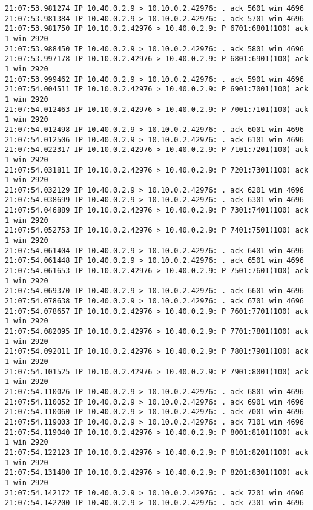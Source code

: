 \documentclass[a4paper,12pt]{article}
\begin{document}
\begin{Verbatim}
21:07:53.981274 IP 10.40.0.2.9 > 10.10.0.2.42976: . ack 5601 win 4696 
21:07:53.981384 IP 10.40.0.2.9 > 10.10.0.2.42976: . ack 5701 win 4696 
21:07:53.981750 IP 10.10.0.2.42976 > 10.40.0.2.9: P 6701:6801(100) ack 1 win 2920 
21:07:53.988450 IP 10.40.0.2.9 > 10.10.0.2.42976: . ack 5801 win 4696 
21:07:53.997178 IP 10.10.0.2.42976 > 10.40.0.2.9: P 6801:6901(100) ack 1 win 2920 
21:07:53.999462 IP 10.40.0.2.9 > 10.10.0.2.42976: . ack 5901 win 4696 
21:07:54.004511 IP 10.10.0.2.42976 > 10.40.0.2.9: P 6901:7001(100) ack 1 win 2920 
21:07:54.012463 IP 10.10.0.2.42976 > 10.40.0.2.9: P 7001:7101(100) ack 1 win 2920 
21:07:54.012498 IP 10.40.0.2.9 > 10.10.0.2.42976: . ack 6001 win 4696 
21:07:54.012506 IP 10.40.0.2.9 > 10.10.0.2.42976: . ack 6101 win 4696 
21:07:54.022317 IP 10.10.0.2.42976 > 10.40.0.2.9: P 7101:7201(100) ack 1 win 2920 
21:07:54.031811 IP 10.10.0.2.42976 > 10.40.0.2.9: P 7201:7301(100) ack 1 win 2920 
21:07:54.032129 IP 10.40.0.2.9 > 10.10.0.2.42976: . ack 6201 win 4696 
21:07:54.038699 IP 10.40.0.2.9 > 10.10.0.2.42976: . ack 6301 win 4696 
21:07:54.046889 IP 10.10.0.2.42976 > 10.40.0.2.9: P 7301:7401(100) ack 1 win 2920 
21:07:54.052753 IP 10.10.0.2.42976 > 10.40.0.2.9: P 7401:7501(100) ack 1 win 2920 
21:07:54.061404 IP 10.40.0.2.9 > 10.10.0.2.42976: . ack 6401 win 4696 
21:07:54.061448 IP 10.40.0.2.9 > 10.10.0.2.42976: . ack 6501 win 4696 
21:07:54.061653 IP 10.10.0.2.42976 > 10.40.0.2.9: P 7501:7601(100) ack 1 win 2920 
21:07:54.069370 IP 10.40.0.2.9 > 10.10.0.2.42976: . ack 6601 win 4696 
21:07:54.078638 IP 10.40.0.2.9 > 10.10.0.2.42976: . ack 6701 win 4696 
21:07:54.078657 IP 10.10.0.2.42976 > 10.40.0.2.9: P 7601:7701(100) ack 1 win 2920 
21:07:54.082095 IP 10.10.0.2.42976 > 10.40.0.2.9: P 7701:7801(100) ack 1 win 2920 
21:07:54.092011 IP 10.10.0.2.42976 > 10.40.0.2.9: P 7801:7901(100) ack 1 win 2920 
21:07:54.101525 IP 10.10.0.2.42976 > 10.40.0.2.9: P 7901:8001(100) ack 1 win 2920 
21:07:54.110026 IP 10.40.0.2.9 > 10.10.0.2.42976: . ack 6801 win 4696 
21:07:54.110052 IP 10.40.0.2.9 > 10.10.0.2.42976: . ack 6901 win 4696 
21:07:54.110060 IP 10.40.0.2.9 > 10.10.0.2.42976: . ack 7001 win 4696 
21:07:54.119003 IP 10.40.0.2.9 > 10.10.0.2.42976: . ack 7101 win 4696 
21:07:54.119040 IP 10.10.0.2.42976 > 10.40.0.2.9: P 8001:8101(100) ack 1 win 2920 
21:07:54.122123 IP 10.10.0.2.42976 > 10.40.0.2.9: P 8101:8201(100) ack 1 win 2920 
21:07:54.131480 IP 10.10.0.2.42976 > 10.40.0.2.9: P 8201:8301(100) ack 1 win 2920 
21:07:54.142172 IP 10.40.0.2.9 > 10.10.0.2.42976: . ack 7201 win 4696 
21:07:54.142200 IP 10.40.0.2.9 > 10.10.0.2.42976: . ack 7301 win 4696 

\end{Verbatim}
\end{document}
